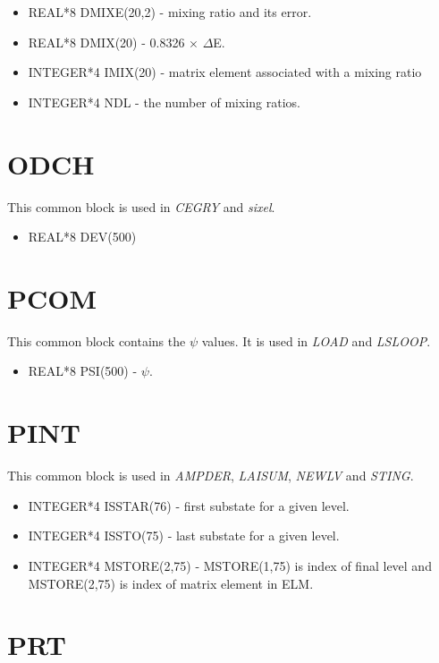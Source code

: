 \begin{itemize}
\item REAL*8 DMIXE(20,2) - mixing ratio and its error.
\item REAL*8 DMIX(20) - 0.8326 $\times$ $\Delta$E.
\item INTEGER*4 IMIX(20) - matrix element associated with a mixing ratio
\item INTEGER*4 NDL - the number of mixing ratios.
\end{itemize}

\section{ODCH}

This common block is used in {\em CEGRY} and {\em sixel}.

\begin{itemize}
\item REAL*8 DEV(500)
\end{itemize}

\section{PCOM}

This common block contains the $\psi$ values. It is used in {\em LOAD} and
{\em LSLOOP}.

\begin{itemize}
\item REAL*8 PSI(500) - $\psi$.
\end{itemize}

\section{PINT}

This common block is used in {\em AMPDER}, {\em LAISUM}, {\em NEWLV} and
{\em STING}.

\begin{itemize}
\item INTEGER*4 ISSTAR(76) - first substate for a given level.
\item INTEGER*4 ISSTO(75) - last substate for a given level.
\item INTEGER*4 MSTORE(2,75) - MSTORE(1,75) is index of final level and
MSTORE(2,75) is index of matrix element in ELM.
\end{itemize}

\section{PRT}

